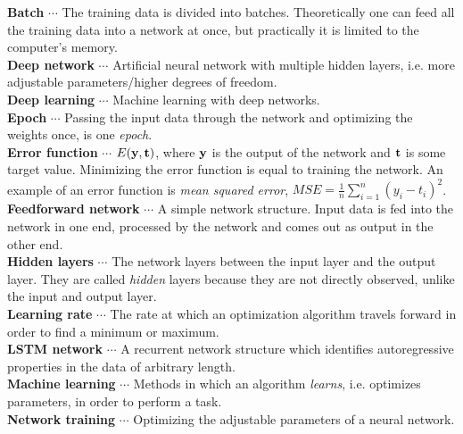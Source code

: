\documentclass[12pt, letterpaper]{amsart}%
\begin{document}
\noindent
\textbf{Batch} $\cdots$ The training data is divided into batches. Theoretically one can feed all the training data into a network at once, but practically it is limited to the computer's memory.
\\

\noindent
\textbf{Deep network} $\cdots$ Artificial neural network with multiple hidden layers, i.e. more adjustable parameters/higher degrees of freedom.
\\

\noindent
\textbf{Deep learning} $\cdots$ Machine learning with deep networks.
\\

\noindent
\textbf{Epoch} $\cdots$ Passing the input data through the network and optimizing the weights once, is one \textit{epoch}.
\\

\noindent
\textbf{Error function} $\cdots$ $E(\bold{y},\bold{t})$, where $\bold{y}$ is the output of the network and $\bold{t}$ is some target value. Minimizing the error function is equal to training the network. An example of an error function is \textit{mean squared error}, $MSE = \frac{1}{n} \sum_{i=1}^n (y_i - t_i)^2$.
\\

\noindent
\textbf{Feedforward network} $\cdots$ A simple network structure. Input data is fed into the network in one end, processed by the network and comes out as output in the other end.
\\

\noindent
\textbf{Hidden layers} $\cdots$ The network layers between the input layer and the output layer. They are called \textit{hidden} layers because they are not directly observed, unlike the input and output layer.
\\

\noindent
\textbf{Learning rate} $\cdots$ The rate at which an optimization algorithm travels forward in order to find a minimum or maximum.
\\

\noindent
\textbf{LSTM network} $\cdots$ A recurrent network structure which identifies autoregressive properties in the data of arbitrary length.
\\

\noindent
\textbf{Machine learning} $\cdots$ Methods in which an algorithm \textit{learns}, i.e. optimizes parameters, in order to perform a task. 
\\

\noindent
\textbf{Network training} $\cdots$ Optimizing the adjustable parameters of a neural network. 
\\
\end{document}
